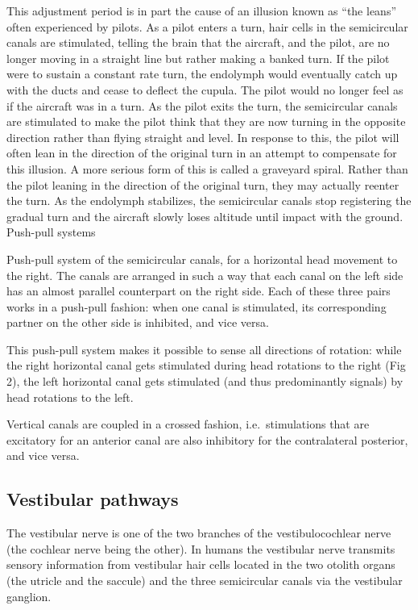 \documentclass[]{book}
\begin{document}
This adjustment period is in part the cause of an illusion known as ``the leans'' often experienced by pilots. As a pilot enters a turn, hair cells in the semicircular canals are stimulated, telling the brain that the aircraft, and the pilot, are no longer moving in a straight line but rather making a banked turn. If the pilot were to sustain a constant rate turn, the endolymph would eventually catch up with the ducts and cease to deflect the cupula. The pilot would no longer feel as if the aircraft was in a turn. As the pilot exits the turn, the semicircular canals are stimulated to make the pilot think that they are now turning in the opposite direction rather than flying straight and level. In response to this, the pilot will often lean in the direction of the original turn in an attempt to compensate for this illusion. A more serious form of this is called a graveyard spiral. Rather than the pilot leaning in the direction of the original turn, they may actually reenter the turn. As the endolymph stabilizes, the semicircular canals stop registering the gradual turn and the aircraft slowly loses altitude until impact with the ground.
Push-pull systems

Push-pull system of the semicircular canals, for a horizontal head movement to the right.
The canals are arranged in such a way that each canal on the left side has an almost parallel counterpart on the right side. Each of these three pairs works in a push-pull fashion: when one canal is stimulated, its corresponding partner on the other side is inhibited, and vice versa.

This push-pull system makes it possible to sense all directions of rotation: while the right horizontal canal gets stimulated during head rotations to the right (Fig 2), the left horizontal canal gets stimulated (and thus predominantly signals) by head rotations to the left.

Vertical canals are coupled in a crossed fashion, i.e.~stimulations that are excitatory for an anterior canal are also inhibitory for the contralateral posterior, and vice versa.

\hypertarget{vestibular-pathways}{%
\subsection{Vestibular pathways}\label{vestibular-pathways}}

The vestibular nerve is one of the two branches of the vestibulocochlear nerve (the cochlear nerve being the other). In humans the vestibular nerve transmits sensory information from vestibular hair cells located in the two otolith organs (the utricle and the saccule) and the three semicircular canals via the vestibular ganglion.
\end{document}
